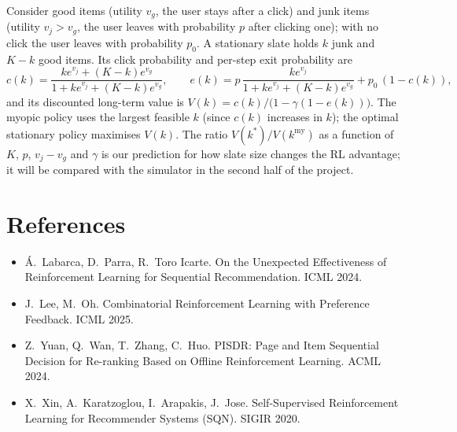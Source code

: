 \documentclass[11pt]{article}
\theoremstyle{remark}
\begin{document}
Consider good items (utility $v_g$, the user stays after a click) and junk items (utility $v_j > v_g$,
the user leaves with probability $p$ after clicking one); with no click the user leaves with probability $p_0$.
A stationary slate holds $k$ junk and $K - k$ good items. Its click probability and per-step exit probability are
\[
c(k) = \frac{k e^{v_j} + (K-k) e^{v_g}}{1 + k e^{v_j} + (K-k) e^{v_g}}, \qquad
e(k) = p\, \frac{k e^{v_j}}{1 + k e^{v_j} + (K-k) e^{v_g}} + p_0\,(1 - c(k)),
\]
and its discounted long-term value is $V(k) = c(k) / \bigl(1 - \gamma(1 - e(k))\bigr)$.
The myopic policy uses the largest feasible $k$ (since $c(k)$ increases in $k$); the optimal stationary policy
maximises $V(k)$. The ratio $V(k^*)/V(k^{\mathrm{my}})$ as a function of $K$, $p$, $v_j - v_g$ and $\gamma$
is our prediction for how slate size changes the RL advantage; it will be compared with the simulator in the
second half of the project.

\section*{References}
\begin{itemize}
\item \'A.~Labarca, D.~Parra, R.~Toro Icarte. On the Unexpected Effectiveness of Reinforcement Learning for
Sequential Recommendation. ICML 2024.
\item J.~Lee, M.~Oh. Combinatorial Reinforcement Learning with Preference Feedback. ICML 2025.
\item Z.~Yuan, Q.~Wan, T.~Zhang, C.~Huo. PISDR: Page and Item Sequential Decision for Re-ranking Based on Offline
Reinforcement Learning. ACML 2024.
\item X.~Xin, A.~Karatzoglou, I.~Arapakis, J.~Jose. Self-Supervised Reinforcement Learning for Recommender
Systems (SQN). SIGIR 2020.
\end{itemize}
\end{document}
